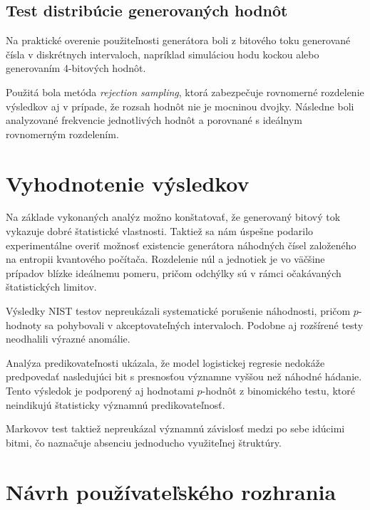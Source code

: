 \subsection{Test distribúcie generovaných hodnôt}


Na praktické overenie použiteľnosti generátora boli z bitového toku generované čísla v diskrétnych intervaloch, napríklad simuláciou hodu kockou alebo generovaním 4-bitových hodnôt.


Použitá bola metóda \textit{rejection sampling}, ktorá zabezpečuje rovnomerné rozdelenie výsledkov aj v prípade, že rozsah hodnôt nie je mocninou dvojky. Následne boli analyzované frekvencie jednotlivých hodnôt a porovnané s ideálnym rovnomerným rozdelením.


\section{Vyhodnotenie výsledkov}


Na základe vykonaných analýz možno konštatovať, že generovaný bitový tok vykazuje dobré štatistické vlastnosti.
Taktiež sa nám úspešne podarilo experimentálne overiť možnosť existencie generátora náhodných čísel založeného na entropii kvantového počítača.
Rozdelenie núl a jednotiek je vo väčšine prípadov blízke ideálnemu pomeru, pričom odchýlky sú v rámci očakávaných štatistických limitov.


Výsledky NIST testov nepreukázali systematické porušenie náhodnosti, pričom $p$-hodnoty sa pohybovali v akceptovateľných intervaloch.
Podobne aj rozšírené testy neodhalili výrazné anomálie.


Analýza predikovateľnosti ukázala, že model logistickej regresie nedokáže predpovedať nasledujúci bit s presnosťou významne vyššou než náhodné hádanie.
Tento výsledok je podporený aj hodnotami $p$-hodnôt z binomického testu, ktoré neindikujú štatisticky významnú predikovateľnosť.


Markovov test taktiež nepreukázal významnú závislosť medzi po sebe idúcimi bitmi, čo naznačuje absenciu jednoducho využiteľnej štruktúry.




\section{Návrh používateľského rozhrania}

